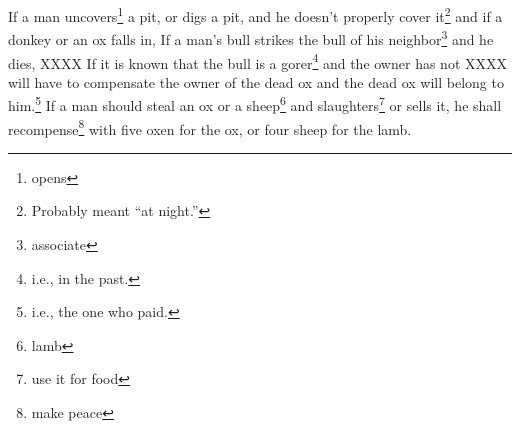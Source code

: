\begin{enumerate}[align=center]
     If a man uncovers\footnote{opens} a pit, or digs a pit, and he doesn't properly cover it\footnote{Probably meant ``at night.''} and if a donkey or an ox falls in,%
     If a man's bull strikes the bull of his neighbor\footnote{associate} and he dies, XXXX%
     If it is known that the bull is a gorer\footnote{i.e., in the past.} and the owner has not XXXX will have to compensate the owner of the dead ox and the dead ox will belong to him.\footnote{i.e., the one who paid.}%
     If a man should steal an ox or a sheep\footnote{lamb} and slaughters\footnote{use it for food} or sells it, he shall recompense\footnote{make peace} with five oxen for the ox, or four sheep for the lamb.%
\end{enumerate}
